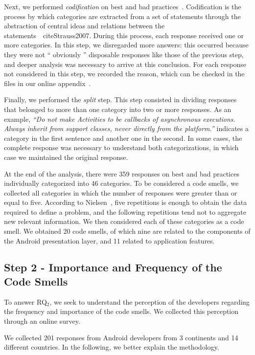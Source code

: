 Next, we performed \textit{codification} on best and bad practices~\cite{Strauss2007, Saldana2013}. Codification is the process by which categories are extracted from a set of statements through the abstraction of central ideas and relations between the statements~\ cite{Strauss2007}. During this process, each response received one or more categories. In this step, we disregarded more answers: this occurred because they were not `` obviously '' disposable responses like those of the previous step, and deeper analysis was necessary to arrive at this conclusion. For each response not considered in this step, we recorded the reason, which can be checked in the files in our online appendix~\cite{apendice}.

Finally, we performed the \textit {split} step. This step consisted in dividing responses that belonged to more than one category into two or more responses.
As an example, \textit{``Do not make Activities to be callbacks of asynchronous executions. Always inherit from support classes, never directly from the platform.''} indicates a category in the first sentence and another one in the second. In some cases, the complete response was necessary to understand both categorizations, in which case we maintained the original response.

At the end of the analysis, there were 359 responses on best and bad practices individually categorized into 46 categories. 
To be considered a code smells, we collected all categories in which the number
of responses were greater than or equal to five.
According to Nielsen~\cite{NielsenMagicNumber:00}, five repetitions is enough to obtain the data required to define a problem, and the following repetitions tend not to aggregate new relevant information. We then considered each of these categories as a code smell.
We obtained 20 code smells, of which nine are related to the components of the Android presentation layer, and 11 related to application features.

\subsection{Step 2 - Importance and Frequency of the Code Smells}

To answer RQ$_2$, we seek to understand the perception of the developers regarding the frequency and importance of the code smells. We collected this perception through an online survey.

We collected 201 responses from Android developers from 3 continents and 14 different countries. In the following, we better explain the methodology.

